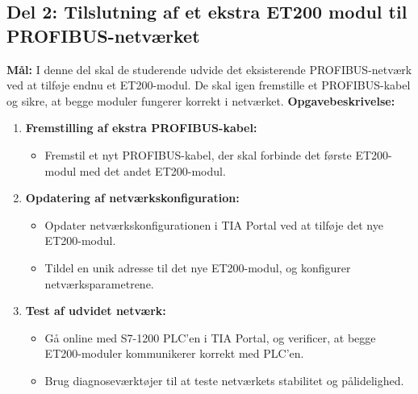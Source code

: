 \subsection*{Del 2: Tilslutning af et ekstra ET200 modul til PROFIBUS-netværket}
\textbf{Mål:} I denne del skal de studerende udvide det eksisterende PROFIBUS-netværk ved at tilføje endnu et ET200-modul. De skal igen fremstille et PROFIBUS-kabel og sikre, at begge moduler fungerer korrekt i netværket.
\newline\newline\noindent
\textbf{Opgavebeskrivelse:}
\begin{enumerate}
	\item \textbf{Fremstilling af ekstra PROFIBUS-kabel:}
	\begin{itemize}
		\item Fremstil et nyt PROFIBUS-kabel, der skal forbinde det første ET200-modul med det andet ET200-modul.
	\end{itemize}
	\item \textbf{Opdatering af netværkskonfiguration:}
	\begin{itemize}
		\item Opdater netværkskonfigurationen i TIA Portal ved at tilføje det nye ET200-modul.
		\item Tildel en unik adresse til det nye ET200-modul, og konfigurer netværksparametrene.
	\end{itemize}
	\item \textbf{Test af udvidet netværk:}
	\begin{itemize}
		\item Gå online med S7-1200 PLC’en i TIA Portal, og verificer, at begge ET200-moduler kommunikerer korrekt med PLC’en.
		\item Brug diagnoseværktøjer til at teste netværkets stabilitet og pålidelighed.
	\end{itemize}
\end{enumerate}

